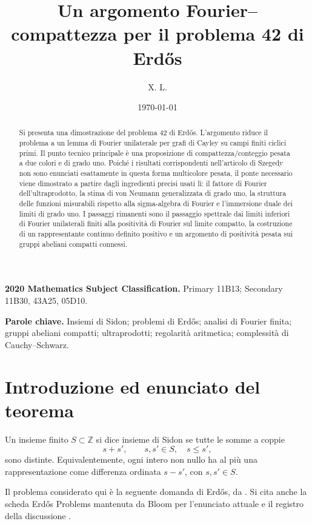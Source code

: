 \documentclass[11pt]{article}
\title{Un argomento Fourier--compattezza per il problema 42 di Erd\H{o}s}
\author{X. L.}
\date{\today}
\numberwithin{equation}{section}
\newcommand{\Z}{\mathbb Z}
\newcommand{\1}{\mathbf 1}
\begin{document}
\maketitle

\begin{abstract}
Si presenta una dimostrazione del problema 42 di Erd\H{o}s. L'argomento riduce il problema a un lemma di Fourier unilaterale per grafi di Cayley su campi finiti ciclici primi. Il punto tecnico principale è una proposizione di compattezza/conteggio pesata a due colori e di grado uno. Poiché i risultati corrispondenti nell'articolo di Szegedy non sono enunciati esattamente in questa forma multicolore pesata, il ponte necessario viene dimostrato a partire dagli ingredienti precisi usati lì: il fattore di Fourier dell'ultraprodotto, la stima di von Neumann generalizzata di grado uno, la struttura delle funzioni misurabili rispetto alla sigma-algebra di Fourier e l'immersione duale dei limiti di grado uno. I passaggi rimanenti sono il passaggio spettrale dai limiti inferiori di Fourier unilaterali finiti alla positività di Fourier sul limite compatto, la costruzione di un rappresentante continuo definito positivo e un argomento di positività pesata sui gruppi abeliani compatti connessi.
\end{abstract}

\medskip
\noindent\textbf{2020 Mathematics Subject Classification.}
Primary 11B13; Secondary 11B30, 43A25, 05D10.

\medskip
\noindent\textbf{Parole chiave.}
Insiemi di Sidon; problemi di Erd\H{o}s; analisi di Fourier finita; gruppi abeliani compatti; ultraprodotti; regolarità aritmetica; complessità di Cauchy--Schwarz.

\tableofcontents

\section{Introduzione ed enunciato del teorema}

Un insieme finito \(S\subset\Z\) si dice insieme di Sidon se tutte le somme a coppie
\[
        s+s',\qquad s,s'\in S,\quad s\le s',
\]
sono distinte. Equivalentemente, ogni intero non nullo ha al più una rappresentazione come differenza ordinata \(s-s'\), con \(s,s'\in S\).

Il problema considerato qui è la seguente domanda di Erd\H{o}s, da \cite{Erdos1995}. Si cita anche la scheda Erd\H{o}s Problems mantenuta da Bloom per l'enunciato attuale e il registro della discussione \cite{BloomErdos42}.
\end{document}
